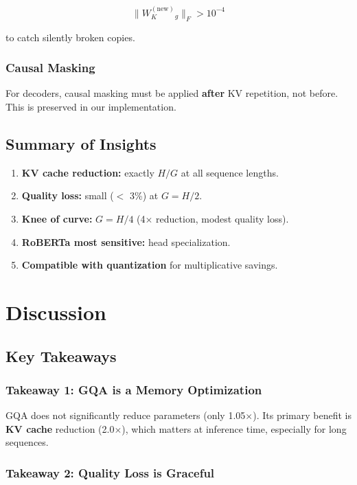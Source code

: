\[
\|W_K^{(\text{new})}_g\|_F > 10^{-4}
\tag{8.1}
\]

to catch silently broken copies.

\subsubsection{Causal Masking}

For decoders, causal masking must be applied \textbf{after} KV repetition, not 
before. This is preserved in our implementation.

\subsection{Summary of Insights}

\begin{enumerate}
\item \textbf{KV cache reduction:} exactly $H / G$ at all sequence lengths.
\item \textbf{Quality loss:} small ($<$ 3\%) at $G = H/2$.
\item \textbf{Knee of curve:} $G = H/4$ (4$\times$ reduction, modest quality loss).
\item \textbf{RoBERTa most sensitive:} head specialization.
\item \textbf{Compatible with quantization} for multiplicative savings.
\end{enumerate}


\section{Discussion}

\subsection{Key Takeaways}

\subsubsection{Takeaway 1: GQA is a Memory Optimization}

GQA does not significantly reduce parameters (only 1.05$\times$). Its 
primary benefit is \textbf{KV cache} reduction (2.0$\times$), which matters at 
inference time, especially for long sequences.

\subsubsection{Takeaway 2: Quality Loss is Graceful}

